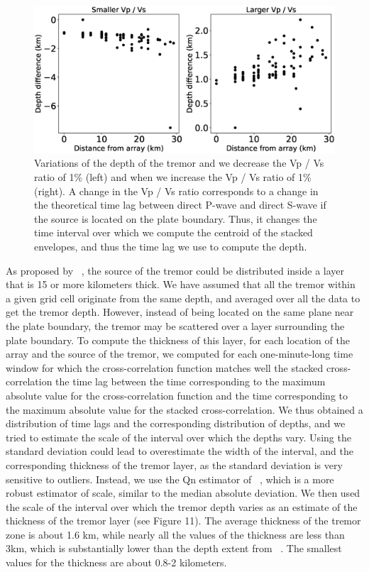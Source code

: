 \documentclass[draft]{agujournal2019}
\begin{document}
\begin{figure}
\noindent\includegraphics[width=\textwidth, trim={0cm 0cm 0cm 0cm},clip]{figures/PWS_PWS.eps}
\caption{Variations of the depth of the tremor and we decrease the Vp / Vs ratio of 1\% (left) and when we increase the Vp / Vs ratio of 1\% (right). A change in the Vp / Vs ratio corresponds to a change in the theoretical time lag between direct P-wave and direct S-wave if the source is located on the plate boundary. Thus, it changes the time interval over which we compute the centroid of the stacked envelopes, and thus the time lag we use to compute the depth.}
\label{pngfiguresample}
\end{figure}

As proposed by ~, the source of the tremor could be distributed inside a layer that is 15 or more kilometers thick. We have assumed that all the tremor within a given grid cell originate from the same depth, and averaged over all the data to get the tremor depth. However, instead of being located on the same plane near the plate boundary, the tremor may be scattered over a layer surrounding the plate boundary. To compute the thickness of this layer, for each location of the array and the source of the tremor, we computed for each one-minute-long time window for which the cross-correlation function matches well the stacked cross-correlation the time lag between the time corresponding to the maximum absolute value for the cross-correlation function and the time corresponding to the maximum absolute value for the stacked cross-correlation. We thus obtained a distribution of time lags and the corresponding distribution of depths, and we tried to estimate the scale of the interval over which the depths vary. Using the standard deviation could lead to overestimate the width of the interval, and the corresponding thickness of the tremor layer, as the standard deviation is very sensitive to outliers. Instead, we use the Qn estimator of ~, which is a more robust estimator of scale, similar to the median absolute deviation. We then used the scale of the interval over which the tremor depth varies as an estimate of the thickness of the tremor layer (see Figure 11). The average thickness of the tremor zone is about 1.6 km, while nearly all the values of the thickness are less than 3km, which is substantially lower than the depth extent from ~. The smallest values for the thickness are about 0.8-2 kilometers. \\
\end{document}

